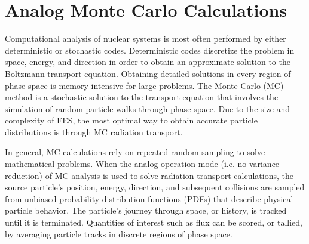 


\section{Analog Monte Carlo Calculations} \label{sec:analog_mc}
Computational analysis of nuclear systems is most often performed by either
deterministic or stochastic codes.  Deterministic codes discretize the problem
in space, energy, and direction in order to obtain an approximate solution to the Boltzmann transport equation.  Obtaining detailed solutions in every region of phase space is memory intensive for large problems.
The Monte Carlo (MC) method is a stochastic solution to the transport equation \cite{l_m}
that involves the simulation of random particle
walks through phase space.  
Due to the size and complexity of FES, the most optimal way to 
obtain accurate particle distributions is through MC radiation transport.


In general, MC calculations rely on repeated random sampling to solve
mathematical problems.  
When the analog operation mode (i.e. no variance reduction) of MC analysis is 
used to solve radiation transport calculations, 
the source particle's position, energy, direction,
and subsequent collisions are sampled from unbiased probability
distribution functions (PDFs) that describe physical particle behavior.
The particle's journey through space, or history, is tracked until it is
terminated.
Quantities of interest such as flux can be
scored, or tallied, by averaging particle tracks
in discrete regions of phase space.

